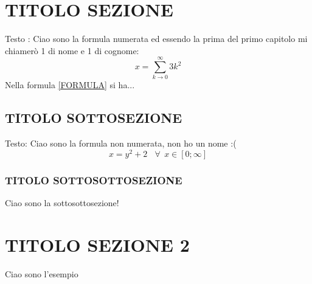 \section{TITOLO SEZIONE}
Testo : Ciao sono la formula numerata ed essendo la prima del primo capitolo mi chiamerò 1 di nome e 1 di cognome:
\begin{equation}
    x = \sum_{k \to 0} ^{\infty} 3k^2
    \label{FORMULA}
\end{equation}
Nella formula \eqref{FORMULA} si ha...
\subsection{TITOLO SOTTOSEZIONE}
Testo: Ciao sono la formula non numerata, non ho un nome :(
\begin{equation*}
    x=y^2+2  \ \ \ \ \forall \ \ x \in [0;\infty]
\end{equation*}
\subsubsection{TITOLO SOTTOSOTTOSEZIONE}
Ciao sono la sottosottosezione!
\section{TITOLO SEZIONE 2}
\begin{esempio}
    Ciao sono l'esempio 
\end{esempio}